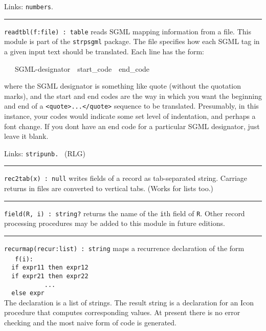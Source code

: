 Links: \texttt{numbers}. 

\vspace{0.25cm}\hrule{}

\texttt{readtbl(f:file) : table} reads SGML mapping
information from a file. This module is part of the \texttt{strpsgml}
package. The file specifies how each SGML tag in a given input text
should be translated. Each line has the form:

\ \ \ SGML-designator\ \ start\_code\ \ end\_code

where the SGML designator is something like
{\textquotedbl}quote{\textquotedbl} (without the quotation marks), and
the start and end codes are the way in which you want the beginning and
end of a
\texttt{{\textless}quote{\textgreater}...{\textless}/quote{\textgreater}}
sequence to be translated. Presumably, in this instance, your codes
would indicate some set level of indentation, and perhaps a font
change. If you don{\textquotesingle}t have an end code for a particular
SGML designator, just leave it blank.

Links: \texttt{stripunb.} \ (RLG)

\vspace{0.25cm}\hrule{}

\texttt{rec2tab(x) : null} writes fields of a record as tab-separated
string. Carriage returns in files are converted to vertical tabs.
(Works for lists too.) \ 

\vspace{0.25cm}\hrule{}

\texttt{field(R, i) : string?} returns the name of the \texttt{i}th
field of \texttt{R}. Other record processing procedures may be added to
this module in future editions. 

\vspace{0.25cm}\hrule{}

\texttt{recurmap(recur:list) : string} maps a recurrence declaration of
the form\\
 \ \ \texttt{\ f(i):\\
 \ \ if expr11 then expr12\\
 \ \ if expr21 then expr22\\
}\texttt{ \ \ \ \ \ \ \ \ \ \ ...\\
 \ \ else expr \\
}The declaration is a list of strings. The result string is a
declaration for an Icon procedure that computes corresponding values.
At present there is no error checking and the most naive form of code
is generated. 

